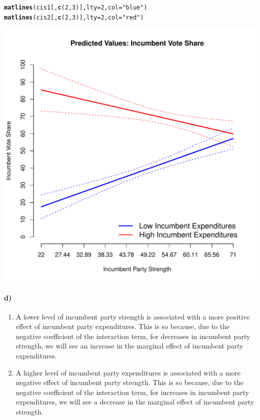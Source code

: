 \documentclass[12pt]{article}\usepackage[]{graphicx}\usepackage[]{color}
\makeatletter
\def\maxwidth{ %
  \ifdim\Gin@nat@width>\linewidth
    \linewidth
  \else
    \Gin@nat@width
  \fi
}
\newcommand{\hlnum}[1]{\textcolor[rgb]{0.686,0.059,0.569}{#1}}%
\newcommand{\hlstr}[1]{\textcolor[rgb]{0.192,0.494,0.8}{#1}}%
\newcommand{\hlstd}[1]{\textcolor[rgb]{0.345,0.345,0.345}{#1}}%
\newcommand{\hlkwc}[1]{\textcolor[rgb]{0.333,0.667,0.333}{#1}}%
\newcommand{\hlkwd}[1]{\textcolor[rgb]{0.737,0.353,0.396}{\textbf{#1}}}%
\newenvironment{kframe}{%
 \def\at@end@of@kframe{}%
 \ifinner\ifhmode%
  \def\at@end@of@kframe{\end{minipage}}%
  \begin{minipage}{\columnwidth}%
 \fi\fi%
 \def\FrameCommand##1{\hskip\@totalleftmargin \hskip-\fboxsep
 \colorbox{shadecolor}{##1}\hskip-\fboxsep
     \hskip-\linewidth \hskip-\@totalleftmargin \hskip\columnwidth}%
 \MakeFramed {\advance\hsize-\width
   \@totalleftmargin\z@ \linewidth\hsize
   \@setminipage}}%
 {\par\unskip\endMakeFramed%
 \at@end@of@kframe}
\newenvironment{knitrout}{}{} %
\makeatother
\begin{document}
\begin{knitrout}
\begin{kframe}
\begin{alltt}
\hlkwd{matlines}\hlstd{(cis1[,} \hlkwd{c}\hlstd{(}\hlnum{2}\hlstd{,} \hlnum{3}\hlstd{)],} \hlkwc{lty} \hlstd{=} \hlnum{2}\hlstd{,} \hlkwc{col} \hlstd{=} \hlstr{"blue"}\hlstd{)}
\hlkwd{matlines}\hlstd{(cis2[,} \hlkwd{c}\hlstd{(}\hlnum{2}\hlstd{,} \hlnum{3}\hlstd{)],} \hlkwc{lty} \hlstd{=} \hlnum{2}\hlstd{,} \hlkwc{col} \hlstd{=} \hlstr{"red"}\hlstd{)}
\end{alltt}
\end{kframe}
\includegraphics[width=\maxwidth]{figure/unnamed-chunk-3-5} 

\end{knitrout}

\paragraph{d)}

\begin{enumerate}
  \item A lower level of incumbent party strength is associated with a more positive effect of incumbent party expenditures. This is so because, due to the negative coefficient of the interaction term, for decreases in incumbent party strength, we will see an increase in the marginal effect of incumbent party expenditures.
  \item A higher level of incumbent party expenditures is associated with a more negative effect of incumbent party strength. This is so because, due to the negative coefficient of the interaction term, for increases in incumbent party expenditures, we will see a decrease in the marginal effect of incumbent party strength.
\end{enumerate}
\end{document}

